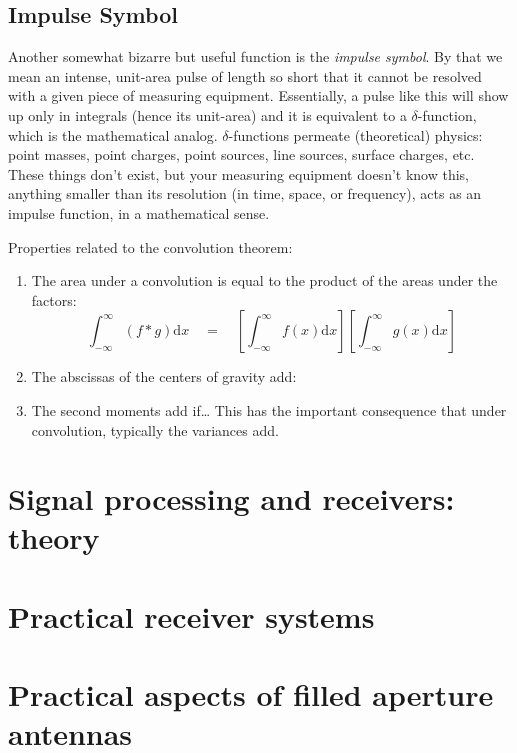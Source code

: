 \documentclass[12pt]{article}
\newcommand{\mar}[1]{\hspace{0pt}\marginpar{-\textcolor{black}{#1}-}}
\begin{document}
\subsection{Impulse Symbol}
\mar{F15}Another somewhat bizarre but useful function is the \textit{impulse
symbol}. By that we mean an intense, unit-area pulse of length so short that it
cannot be resolved with a given piece of measuring equipment. Essentially, a
pulse like this will show up only in integrals (hence its unit-area) and it is
equivalent to a $\delta$-function, which is the mathematical analog.
$\delta$-functions permeate (theoretical) physics: point masses, point charges,
point sources, line sources, surface charges, etc. These things don't exist,
but your measuring equipment doesn't know this, anything smaller than its
resolution (in time, space, or frequency), acts as an impulse function, in a
mathematical sense.

\mar{F24}Properties related to the convolution theorem:
\begin{enumerate}
    \item The area under a convolution is equal to the product of the
        areas under the factors:
        \[
            \int_{-\infty}^{\infty} \left( f*g \right) \mathrm{d}x
            \quad = \quad
            \left[ \int_{-\infty}^{\infty} f(x)\mathrm{d}x \right]
            \left[ \int_{-\infty}^{\infty} g(x)\mathrm{d}x \right]
            \]
    \item The abscissas of the centers of gravity add:
        \[
            \]
    \item The second moments add if\ldots
        This has the important consequence that under convolution,
        typically the variances add.
\end{enumerate}

\newpage
\section{Signal processing and receivers: theory}

\newpage
\section{Practical receiver systems}

\newpage
\section{Practical aspects of filled aperture antennas}
\end{document}
